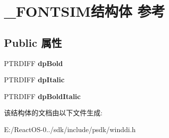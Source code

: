 \hypertarget{struct___f_o_n_t_s_i_m}{}\section{\+\_\+\+F\+O\+N\+T\+S\+I\+M结构体 参考}
\label{struct___f_o_n_t_s_i_m}
\subsection*{Public 属性}
\begin{DoxyCompactItemize}
\item 
\mbox{\label{struct___f_o_n_t_s_i_m_af80df003ba80979b7048c2e98af62e7d}} 
P\+T\+R\+D\+I\+FF {\bfseries dp\+Bold}
\item 
\mbox{\label{struct___f_o_n_t_s_i_m_aa5059610469d9f8479e6ed4dddf04cc5}} 
P\+T\+R\+D\+I\+FF {\bfseries dp\+Italic}
\item 
\mbox{\label{struct___f_o_n_t_s_i_m_a3baae8e179644026c3d4709a142b5c18}} 
P\+T\+R\+D\+I\+FF {\bfseries dp\+Bold\+Italic}
\end{DoxyCompactItemize}


该结构体的文档由以下文件生成\+:\begin{DoxyCompactItemize}
\item 
E\+:/\+React\+O\+S-\/0../sdk/include/psdk/winddi.\+h\end{DoxyCompactItemize}
